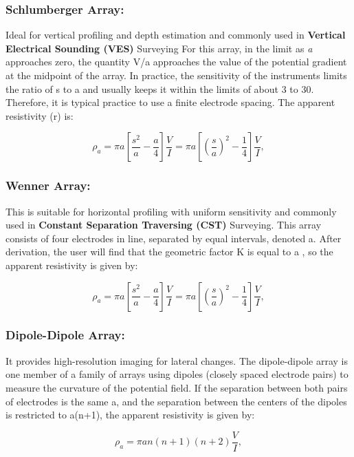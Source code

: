 \documentclass[12pt,a4paper]{report}
\begin{document}
\subsubsection{Schlumberger Array:} 
Ideal for vertical profiling and depth estimation and commonly used in \textbf{Vertical Electrical Sounding (VES)} Surveying For this array, in the limit as \textit{a} approaches zero, the quantity V/a approaches the value of the potential gradient at the midpoint of the array.  In practice, the sensitivity of the instruments limits the ratio of s to a and usually keeps it within the limits of about 3 to 30.  Therefore, it is typical practice to use a finite electrode spacing. The apparent resistivity (r) is:

\begin{equation}
    \rho_a = \pi a \left[ \frac{s^2}{a} - \frac{a}{4} \right] \frac{V}{I} = \pi a \left[ \left( \frac{s}{a} \right)^2 - \frac{1}{4} \right] \frac{V}{I},
\end{equation}

\subsubsection{Wenner Array:}
This is suitable for horizontal profiling with uniform sensitivity and commonly used in \textbf{Constant Separation Traversing (CST)} Surveying. This array consists of four electrodes in line, separated by equal intervals, denoted a. After derivation, the user will find that the geometric factor K is equal to a , so the apparent resistivity is given by:

\begin{equation}
    \rho_a = \pi a \left[ \frac{s^2}{a} - \frac{a}{4} \right] \frac{V}{I} = \pi a \left[ \left( \frac{s}{a} \right)^2 - \frac{1}{4} \right] \frac{V}{I},
\end{equation}

\subsubsection{Dipole-Dipole Array:}
It provides high-resolution imaging for lateral changes. The dipole-dipole array is one member of a family of arrays using dipoles (closely spaced electrode pairs) to measure the curvature of the potential field.  If the separation between both pairs of electrodes is the same a, and the separation between the centers of the dipoles is restricted to a(n+1), the apparent resistivity is given by:

\begin{equation}
    \rho_a = \pi an (n + 1)(n + 2) \frac{V}{I},
\end{equation}
\end{document}
